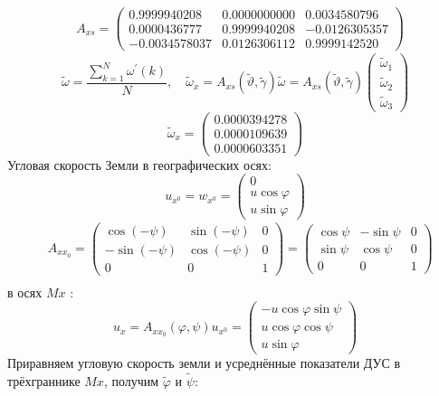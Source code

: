 \documentclass[a4paper,14pt]{article}
\theoremstyle{plain} %
\theoremstyle{definition} %
\theoremstyle{remark} %
\begin{document}
{$$
    \begin{aligned}
         & A_{x s}=\left(\begin{array}{ccc}0.9999940208 & 0.0000000000 & 0.0034580796
             \\0.0000436777 & 0.9999940208 & -0.0126305357 \\
             -0.0034578037     & 0.0126306112 & 0.9999142520
            \end{array}\right)
    \end{aligned}
$$
$$
    \widetilde{\omega}=\frac{\sum_{k=1}^{N} \omega^{\prime}(k)}{N}, \quad \widetilde{\omega}_{x}=A_{x s}(\widetilde{\vartheta}, \widetilde{\gamma}) \widetilde{\omega}=A_{x s}(\widetilde{\vartheta}, \widetilde{\gamma})\left(\begin{array}{c}
            \widetilde{\omega}_{1} \\
            \widetilde{\omega}_{2} \\
            \widetilde{\omega}_{3}
        \end{array}\right)
$$
$$
    \widetilde{\omega}_{x}=\left(\begin{array}{c}
            0.0000394278 \\
            0.0000109639 \\
            0.0000603351
        \end{array}\right)
$$
Угловая скорость Земли в географических осях:
$$
    u_{x^{0}}=w_{x^{0}}=\left(\begin{array}{c}
            0              \\
            u \cos \varphi \\
            u \sin \varphi
        \end{array}\right)
$$
$$
    \begin{aligned}
         & A_{x x_{0}}=\left(\begin{array}{ccc}\cos (-\psi) & \sin (-\psi) & 0 \\-\sin (-\psi) & \cos (-\psi) & 0 \\0 & 0 & 1\end{array}\right)=\left(\begin{array}{ccc}\cos \psi & -\sin \psi & 0 \\\sin \psi & \cos \psi & 0 \\0 & 0 & 1\end{array}\right) \\
    \end{aligned}
$$
в осях $M x$ :
$$
    u_{x}=A_{x x_{0}}(\varphi, \psi) u_{x^{0}}=\left(\begin{array}{c}
            -u \cos \varphi \sin \psi \\
            u \cos \varphi \cos \psi  \\
            u \sin \varphi
        \end{array}\right)
$$
Приравняем угловую скорость земли и усреднённые показатели ДУС в трёхграннике $M x$, получим  $\widetilde{\varphi}$ и $\widetilde{\psi}:$

}
\end{document}
